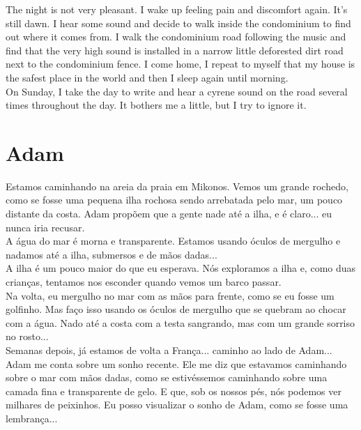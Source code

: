 \documentclass[11pt]{book}
\begin{document}
The night is not very pleasant. I wake up feeling pain and discomfort again. It's still dawn. I hear some sound and decide to walk inside the condominium to find out where it comes from. I walk the condominium road following the music and find that the very high sound is installed in a narrow little deforested dirt road next to the condominium fence. I come home, I repeat to myself that my house is the safest place in the world and then I sleep again until morning. \\

On Sunday, I take the day to write and hear a cyrene sound on the road several times throughout the day. It bothers me a little, but I try to ignore it.

\chapter{Adam}

Estamos caminhando na areia da praia em Mikonos. Vemos um grande rochedo, como se fosse uma pequena ilha rochosa sendo arrebatada pelo mar, um pouco distante da costa. Adam propõem que a gente nade até a ilha, e é claro... eu nunca iria recusar. \\

A água do mar é morna e transparente. Estamos usando óculos de mergulho e nadamos até a ilha, submersos e de mãos dadas... \\

A ilha é um pouco maior do que eu esperava. Nós exploramos a ilha e, como duas crianças, tentamos nos esconder quando vemos um barco passar. \\

Na volta, eu mergulho no mar com as mãos para frente, como se eu fosse um golfinho. Mas faço isso usando os óculos de mergulho que se quebram ao chocar com a água. Nado até a costa com a testa sangrando, mas com um grande sorriso no rosto... \\

Semanas depois, já estamos de volta a França... caminho ao lado de Adam... \\

Adam me conta sobre um sonho recente. Ele me diz que estavamos caminhando sobre o mar com mãos dadas, como se estivéssemos caminhando sobre uma camada fina e transparente de gelo. E que, sob os nossos pés, nós podemos ver milhares de peixinhos. Eu posso visualizar o sonho de Adam, como se fosse uma lembrança... \\
\end{document}
